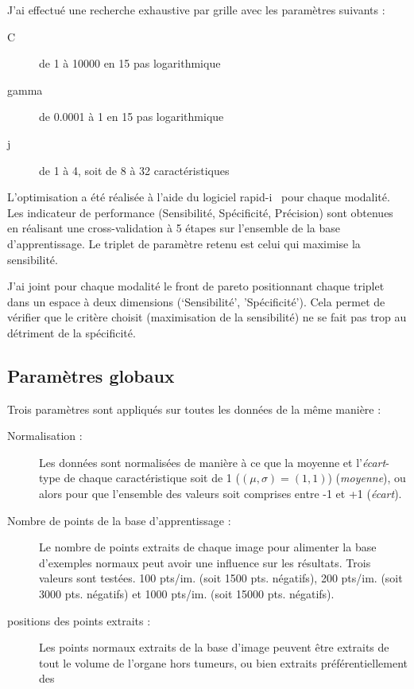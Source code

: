 J'ai effectué une recherche exhaustive par grille avec les paramètres suivants :

\begin{description}
 \item [C] de 1 à 10000 en 15 pas logarithmique
 \item [gamma] de 0.0001 à 1 en 15 pas logarithmique
 \item [j] de 1 à 4, soit de 8 à 32 caractéristiques
\end{description}

L'optimisation a été réalisée à l'aide du logiciel rapid-i~\cite{mierswa2006} pour chaque modalité. Les indicateur de performance (Sensibilité, Spécificité, Précision) sont obtenues en réalisant une cross-validation à 5 étapes sur l'ensemble de la base d'apprentissage. Le triplet de paramètre retenu est celui qui maximise la sensibilité.

J'ai joint pour chaque modalité le front de pareto positionnant chaque triplet dans un espace à deux dimensions (`Sensibilité', 'Spécificité'). Cela permet de vérifier que le critère choisit (maximisation de la sensibilité) ne se fait pas trop au détriment de la spécificité.

\subsection{Paramètres globaux}

Trois paramètres sont appliqués sur toutes les données de la même manière :
\begin{description}
 \item[Normalisation :] Les données sont normalisées de manière à ce que la moyenne et l'\emph{écart}-type de chaque caractéristique soit de 1 ($(\mu, \sigma)=(1,1)$) (\emph{moyenne}), ou alors pour que l'ensemble des valeurs soit comprises entre -1 et +1 (\emph{écart}).
 \item[Nombre de points de la base d'apprentissage :] Le nombre de points extraits de chaque image pour alimenter la base d'exemples normaux peut avoir une influence sur les résultats. Trois valeurs sont testées. 100 pts/im. (soit 1500 pts. négatifs), 200 pts/im. (soit 3000 pts. négatifs) et 1000 pts/im. (soit 15000 pts. négatifs).
 \item[positions des points extraits :] Les points normaux extraits de la base d'image peuvent être extraits de tout le volume de l'organe hors tumeurs, ou bien extraits préférentiellement des 
\end{description}

